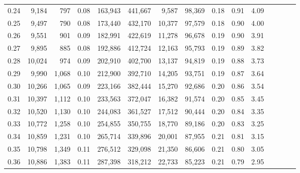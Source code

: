 \begin{tabular}{rrrcrrrrrrrrrrr}
0.24 &   9,184 &    797 &                                       0.08 &  163,943 &  441,667 &    9,587 &   98,369 &  0.18 &  0.91 &                         4.09 \\
0.25 &   9,497 &    790 &                                       0.08 &  173,440 &  432,170 &   10,377 &   97,579 &  0.18 &  0.90 &                         4.00 \\
0.26 &   9,551 &    901 &                                       0.09 &  182,991 &  422,619 &   11,278 &   96,678 &  0.19 &  0.90 &                         3.91 \\
0.27 &   9,895 &    885 &                                       0.08 &  192,886 &  412,724 &   12,163 &   95,793 &  0.19 &  0.89 &                         3.82 \\
0.28 &  10,024 &    974 &                                       0.09 &  202,910 &  402,700 &   13,137 &   94,819 &  0.19 &  0.88 &                         3.73 \\
0.29 &   9,990 &  1,068 &                                       0.10 &  212,900 &  392,710 &   14,205 &   93,751 &  0.19 &  0.87 &                         3.64 \\
0.30 &  10,266 &  1,065 &                                       0.09 &  223,166 &  382,444 &   15,270 &   92,686 &  0.20 &  0.86 &                         3.54 \\
0.31 &  10,397 &  1,112 &                                       0.10 &  233,563 &  372,047 &   16,382 &   91,574 &  0.20 &  0.85 &                         3.45 \\
0.32 &  10,520 &  1,130 &                                       0.10 &  244,083 &  361,527 &   17,512 &   90,444 &  0.20 &  0.84 &                         3.35 \\
0.33 &  10,772 &  1,258 &                                       0.10 &  254,855 &  350,755 &   18,770 &   89,186 &  0.20 &  0.83 &                         3.25 \\
0.34 &  10,859 &  1,231 &                                       0.10 &  265,714 &  339,896 &   20,001 &   87,955 &  0.21 &  0.81 &                         3.15 \\
0.35 &  10,798 &  1,349 &                                       0.11 &  276,512 &  329,098 &   21,350 &   86,606 &  0.21 &  0.80 &                         3.05 \\
0.36 &  10,886 &  1,383 &                                       0.11 &  287,398 &  318,212 &   22,733 &   85,223 &  0.21 &  0.79 &                         2.95 \\

\end{tabular}
